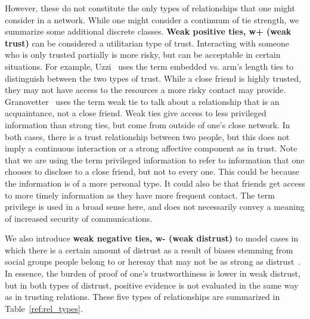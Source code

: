 \documentclass[acmtweb]{acmsmall}
\begin{document}
However, these do not constitute the only types of relationships that
one might consider in a network. While one might consider a continuum
of tie strength, we summarize some additional discrete classes. {\bf
  Weak positive ties, w+ (weak trust)} can be considered a utilitarian
type of trust. Interacting with someone who is only trusted partially
is more risky, but can be acceptable in certain situations. For
example, Uzzi~\cite{Uzzi:1996} uses the term embedded vs. arm's length
ties to distinguish between the two types of trust. While a close
friend is highly trusted, they may not have access to the resources a
more risky contact may provide. Granovetter~\cite{Granovetter:1973}
uses the term weak tie to talk about a relationship that is an
acquaintance, not a close friend. Weak ties give access to less
privileged information than strong ties, but come from outside of
one's close network. In both cases, there is a trust relationship
between two people, but this does not imply a continuous interaction
or a strong affective component as in trust. Note that we are using
the term privileged information to refer to information that one
chooses to disclose to a close friend, but not to every one. This
could be because the information is of a more personal type. It could
also be that friends get access to more timely information as they
have more frequent contact. The term privilege is used in a broad
sense here, and does not necessarily convey a meaning of increased
security of communications.

We also introduce {\bf weak negative ties, w- (weak distrust)} to
model cases in which there is a certain amount of distrust as a result
of biases stemming from social groups people belong to or heresay that
may not be as strong as distrust~\cite{Ames:2011}. In essence, the
burden of proof of one's trustworthiness is lower in weak distrust,
but in both types of distrust, positive evidence is not evaluated in
the same way as in trusting relations. These five types of
relationships are summarized in Table~\ref{ref:rel_types}.
\end{document}
